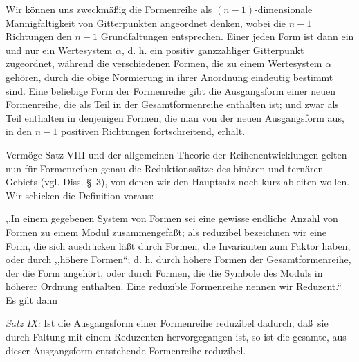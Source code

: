 \documentclass[11pt]{article}
\begin{document}
Wir k\"onnen uns zweckm\"a\ss ig die Formenreihe als $(n-1)$-dimensionale Mannigfaltigkeit von Gitterpunkten angeordnet denken, wobei die $n-1$ Richtungen den $n-1$ Grundfaltungen entsprechen. Einer jeden Form ist dann ein und nur ein Wertesystem $\alpha$, d. h. ein positiv ganzzahliger Gitterpunkt zugeordnet, w\"ahrend die verschiedenen Formen, die zu einem Wertesystem $\alpha$ geh\"oren, durch die obige Normierung in ihrer Anordnung eindeutig bestimmt sind. Eine beliebige Form der Formenreihe gibt die Ausgangsform einer neuen Formenreihe, die als Teil in der Gesamtformenreihe enthalten ist; und zwar als Teil enthalten in denjenigen Formen, die man von der neuen Ausgangsform aus, in den $n-1$ positiven Richtungen fortschreitend, erh\"alt.

Verm\"oge Satz VIII und der allgemeinen Theorie der Reihenentwicklungen gelten nun f\"ur Formenreihen genau die Reduktionss\"atze des bin\"aren und tern\"aren Gebiets (vgl. Diss. \S\ 3), von denen wir den Hauptsatz noch kurz ableiten wollen. Wir schicken die Definition voraus:

,,In einem gegebenen System von Formen sei eine gewisse endliche Anzahl von Formen zu einem Modul zusammengefa\ss t; als reduzibel bezeichnen wir eine Form, die sich ausdr\"ucken l\"a\ss t durch Formen, die Invarianten zum Faktor haben, oder durch ,,h\"ohere Formen``; d. h. durch h\"ohere Formen der Gesamtformenreihe, der die Form angeh\"ort, oder durch Formen, die die Symbole des Moduls in h\"oherer Ordnung enthalten. Eine reduzible Formenreihe nennen wir Reduzent.`` Es gilt dann

\emph{Satz IX:} Ist die Ausgangsform einer Formenreihe reduzibel dadurch, da\ss\ sie durch Faltung mit einem Reduzenten hervorgegangen ist, so ist die gesamte, aus dieser Ausgangsform entstehende Formenreihe reduzibel.
\end{document}
